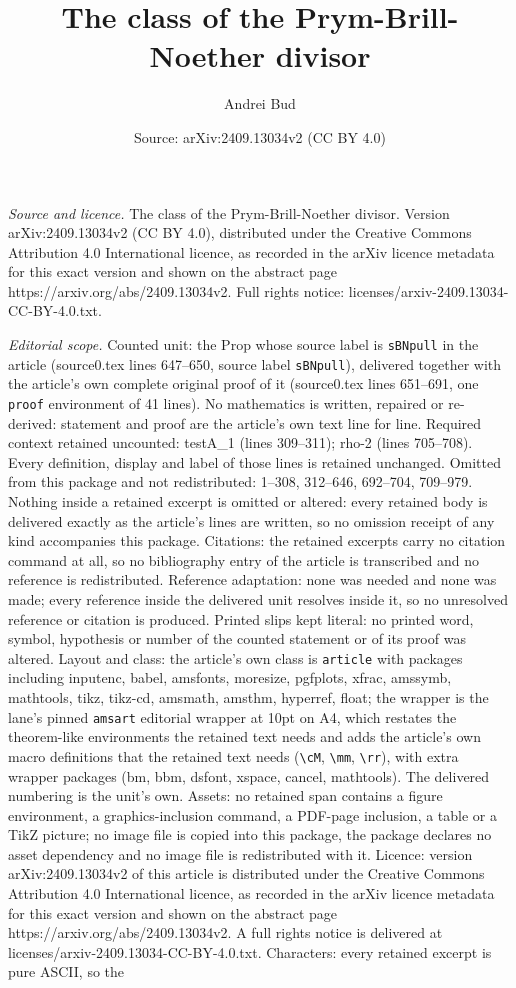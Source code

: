 \documentclass[10pt,a4paper]{amsart}
\title[The class of the Prym-Brill-Noether divisor]{The class of the Prym-Brill-Noether divisor}
\author{Andrei Bud}
\date{Source: arXiv:2409.13034v2 (CC BY 4.0)}
\begin{document}
\maketitle

\noindent\emph{Source and licence.} The class of the Prym-Brill-Noether divisor. Version arXiv:2409.13034v2 (CC BY 4.0), distributed under the Creative Commons Attribution 4.0 International licence, as recorded in the arXiv licence metadata for this exact version and shown on the abstract page https://arxiv.org/abs/2409.13034v2. Full rights notice: licenses/arxiv-2409.13034-CC-BY-4.0.txt.\par\smallskip

\noindent\textit{Editorial scope.} Counted unit: the Prop whose source label is \texttt{sBNpull} in the article (source0.tex lines 647--650, source label \texttt{sBNpull}), delivered together with the article's own complete original proof of it (source0.tex lines 651--691, one \texttt{proof} environment of 41 lines). No mathematics is written, repaired or re-derived: statement and proof are the article's own text line for line. Required context retained uncounted: testA\_1 (lines 309--311); rho-2 (lines 705--708). Every definition, display and label of those lines is retained unchanged. Omitted from this package and not redistributed: 1--308, 312--646, 692--704, 709--979. Nothing inside a retained excerpt is omitted or altered: every retained body is delivered exactly as the article's lines are written, so no omission receipt of any kind accompanies this package. Citations: the retained excerpts carry no citation command at all, so no bibliography entry of the article is transcribed and no reference is redistributed. Reference adaptation: none was needed and none was made; every reference inside the delivered unit resolves inside it, so no unresolved reference or citation is produced. Printed slips kept literal: no printed word, symbol, hypothesis or number of the counted statement or of its proof was altered. Layout and class: the article's own class is \texttt{article} with packages including inputenc, babel, amsfonts, moresize, pgfplots, xfrac, amssymb, mathtools, tikz, tikz-cd, amsmath, amsthm, hyperref, float; the wrapper is the lane's pinned \texttt{amsart} editorial wrapper at 10pt on A4, which restates the theorem-like environments the retained text needs and adds the article's own macro definitions that the retained text needs (\texttt{\textbackslash cM}, \texttt{\textbackslash mm}, \texttt{\textbackslash rr}), with extra wrapper packages (bm, bbm, dsfont, xspace, cancel, mathtools). The delivered numbering is the unit's own. Assets: no retained span contains a figure environment, a graphics-inclusion command, a PDF-page inclusion, a table or a TikZ picture; no image file is copied into this package, the package declares no asset dependency and no image file is redistributed with it. Licence: version arXiv:2409.13034v2 of this article is distributed under the Creative Commons Attribution 4.0 International licence, as recorded in the arXiv licence metadata for this exact version and shown on the abstract page https://arxiv.org/abs/2409.13034v2. A full rights notice is delivered at licenses/arxiv-2409.13034-CC-BY-4.0.txt. Characters: every retained excerpt is pure ASCII, so the 
\end{document}
